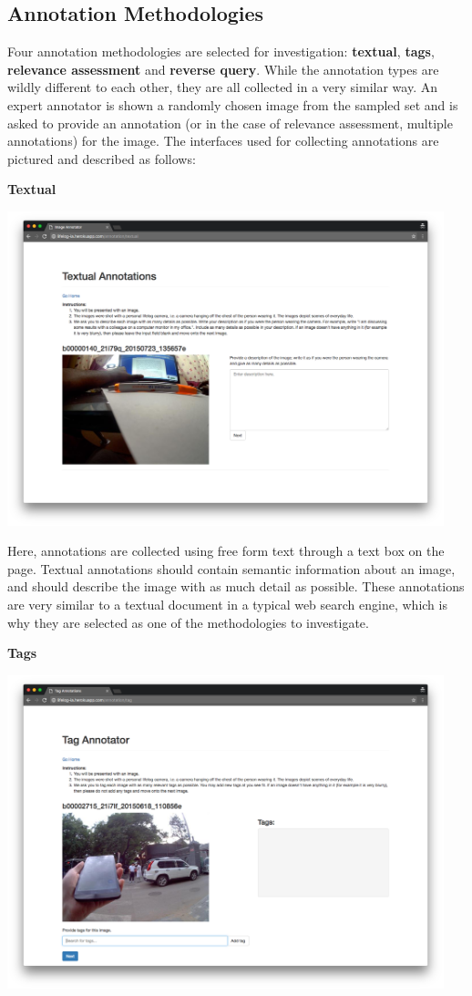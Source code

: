 \subsection{Annotation Methodologies}

Four annotation methodologies are selected for investigation: \textbf{textual}, \textbf{tags}, \textbf{relevance assessment} and \textbf{reverse query}. While the annotation types are wildly different to each other, they are all  collected in a very similar way. An expert annotator is shown a randomly chosen image from the sampled set and is asked to provide an annotation (or in the case of relevance assessment, multiple annotations) for the image. The interfaces used for collecting annotations are pictured and described as follows:

\textbf{Textual}

\includegraphics[width=0.95\textwidth]{images/text-interface}

Here, annotations are collected using free form text through a text box on the page. Textual annotations should contain semantic information about an image, and should describe the image with as much detail as possible. These annotations are very similar to a textual document in a typical web search engine, which is why they are selected as one of the methodologies to investigate.

\newpage
\textbf{Tags}

\includegraphics[width=0.95\textwidth]{images/tag-interface}

